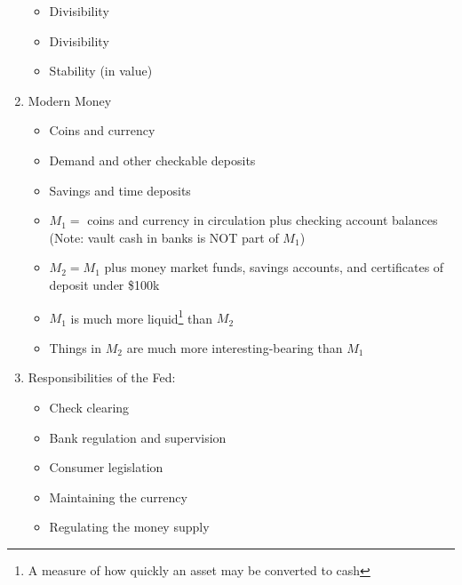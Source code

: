 \documentclass[12pt]{article}
\begin{document}
\begin{enumerate}
\begin{itemize}
      \item Divisibility

      \item Divisibility

      \item Stability (in value)

    \end{itemize}

  \item Modern Money

    \begin{itemize}

      \item Coins and currency

      \item Demand and other checkable deposits

      \item Savings and time deposits

      \item $M_1 = $ coins and currency in circulation plus checking account balances (Note: vault cash in banks is NOT part of $M_1$)

      \item $M_2 = M_1$ plus money market funds, savings accounts, and certificates of deposit under \$100k

      \item $M_1$ is much more liquid\footnote{A measure of how quickly an asset may be converted to cash} than $M_2$

      \item Things in $M_2$ are much more interesting-bearing than $M_1$

    \end{itemize}

  \item Responsibilities of the Fed:

    \begin{itemize}

      \item Check clearing

      \item Bank regulation and supervision

      \item Consumer legislation

      \item Maintaining the currency

      \item Regulating the money supply


\end{itemize}
\end{enumerate}
\end{document}
